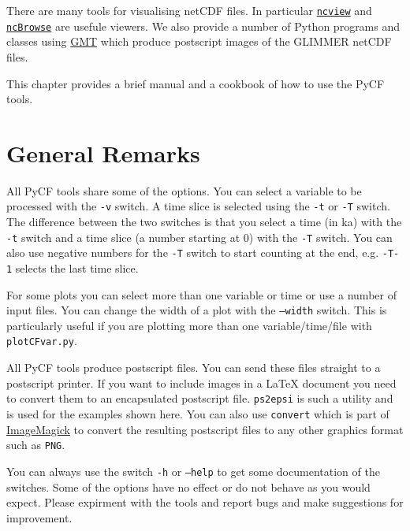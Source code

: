 There are many tools for visualising netCDF files. In particular \href{http://meteora.ucsd.edu/~pierce/ncview\_home\_page.html}{\texttt{ncview}} and \href{http://www.epic.noaa.gov/java/ncBrowse/}{\texttt{ncBrowse}} are usefule viewers. We also provide a number of Python programs and classes using \href{http://gmt.soest.hawaii.edu/}{GMT} which produce postscript images of the GLIMMER netCDF files.

This chapter provides a brief manual and a cookbook of how to use the PyCF tools. 



\section{General Remarks}
All PyCF tools share some of the options. You can select a variable to be processed with the \texttt{-v} switch. A time slice is selected using the \texttt{-t} or \texttt{-T} switch. The difference between the two switches is that you select a time (in ka) with the \texttt{-t} switch and a time slice (a number starting at 0) with the \texttt{-T} switch. You can also use negative numbers for the \texttt{-T} switch to start counting at the end, e.g. \texttt{-T-1} selects the last time slice.

For some plots you can select more than one variable or time or use a number of input files. You can change the width of a plot with the \texttt{--width} switch. This is particularly useful if you are plotting more than one variable/time/file with \texttt{plotCFvar.py}.

All PyCF tools produce postscript files. You can send these files straight to a postscript printer. If you want to include images in a {\LaTeX} document you need to convert them to an encapsulated postscript file. \texttt{ps2epsi} is such a utility and is used for the examples shown here. You can also use \texttt{convert} which is part of \href{http://www.imagemagick.org/script/index.php}{ImageMagick} to convert the resulting postscript files to any other graphics format such as \texttt{PNG}.

You can always use the switch \texttt{-h} or \texttt{--help} to get some documentation of the switches. Some of the options have no effect or do not behave as you would expect. Please expirment with the tools and report bugs and make suggestions for improvement. 




